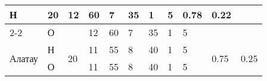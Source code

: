 \begin{table}[]
{\begin{tabular}{|ll|l|llllll|ll|}
    Н &
    \multirow{2}{*}{20} &
    \multicolumn{1}{l|}{12} &
    \multicolumn{1}{l|}{60} &
    \multicolumn{1}{l|}{7} &
    \multicolumn{1}{l|}{35} &
    \multicolumn{1}{l|}{1} &
    5 &
    \multicolumn{1}{l|}{\multirow{2}{*}{0.78}} &
    \multirow{2}{*}{0.22} \\ \cline{2-2} \cline{4-9}
  \multicolumn{1}{|l|}{} &
    О &
     &
    \multicolumn{1}{l|}{12} &
    \multicolumn{1}{l|}{60} &
    \multicolumn{1}{l|}{7} &
    \multicolumn{1}{l|}{35} &
    \multicolumn{1}{l|}{1} &
    5 &
    \multicolumn{1}{l|}{} &
     \\ \hline
  \multicolumn{1}{|l|}{\multirow{2}{*}{Алатау}} &
    Н &
    \multirow{2}{*}{20} &
    \multicolumn{1}{l|}{11} &
    \multicolumn{1}{l|}{55} &
    \multicolumn{1}{l|}{8} &
    \multicolumn{1}{l|}{40} &
    \multicolumn{1}{l|}{1} &
    5 &
    \multicolumn{1}{l|}{\multirow{2}{*}{0.75}} &
    \multirow{2}{*}{0.25} \\ \cline{2-2} \cline{4-9}
  \multicolumn{1}{|l|}{} &
    О &
     &
    \multicolumn{1}{l|}{11} &
    \multicolumn{1}{l|}{55} &
    \multicolumn{1}{l|}{8} &
    \multicolumn{1}{l|}{40} &
    \multicolumn{1}{l|}{1} &
    5 &
    \multicolumn{1}{l|}{} &
     \\ \hline
  \end{tabular}%
  }
\end{table}




